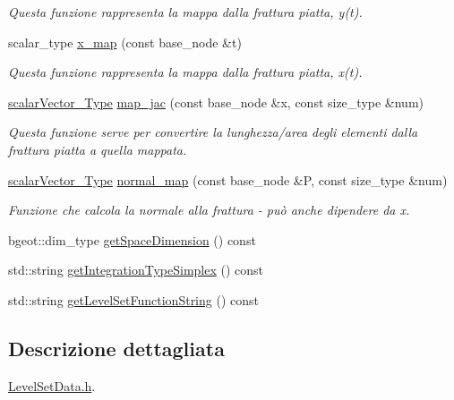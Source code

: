 \begin{DoxyCompactItemize}
\begin{DoxyCompactList}\small\item\em Questa funzione rappresenta la mappa dalla frattura piatta, y(t). \end{DoxyCompactList}\item 
scalar\-\_\-type \hyperlink{classLevelSetData_ae7f10d3f10b72fbb6f703ba7aa8fe17b}{x\-\_\-map} (const base\-\_\-node \&t)
\begin{DoxyCompactList}\small\item\em Questa funzione rappresenta la mappa dalla frattura piatta, x(t). \end{DoxyCompactList}\item 
\hyperlink{Core_8h_a4e75b5863535ba1dd79942de2846eff0}{scalar\-Vector\-\_\-\-Type} \hyperlink{classLevelSetData_a40fcfa36de7ac76613284d03690eb54b}{map\-\_\-jac} (const base\-\_\-node \&x, const size\-\_\-type \&num)
\begin{DoxyCompactList}\small\item\em Questa funzione serve per convertire la lunghezza/area degli elementi dalla frattura piatta a quella mappata. \end{DoxyCompactList}\item 
\hyperlink{Core_8h_a4e75b5863535ba1dd79942de2846eff0}{scalar\-Vector\-\_\-\-Type} \hyperlink{classLevelSetData_a674d56690f4e22cbca38bf4b5f176a5e}{normal\-\_\-map} (const base\-\_\-node \&P, const size\-\_\-type \&num)
\begin{DoxyCompactList}\small\item\em Funzione che calcola la normale alla frattura -\/ può anche dipendere da x. \end{DoxyCompactList}\item 
bgeot\-::dim\-\_\-type \hyperlink{classLevelSetData_aa4c3e1f7876cd318e80f5052689fe9e3}{get\-Space\-Dimension} () const 
\item 
std\-::string \hyperlink{classLevelSetData_a3f8cb21a929065136dcf3a449edb373a}{get\-Integration\-Type\-Simplex} () const 
\item 
std\-::string \hyperlink{classLevelSetData_a672418971ce9b1bf71d3c6bccd278bd7}{get\-Level\-Set\-Function\-String} () const 
\end{DoxyCompactItemize}


\subsection{Descrizione dettagliata}
\hyperlink{LevelSetData_8h}{Level\-Set\-Data.\-h}. 

